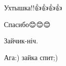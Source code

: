  
 
 
 
 

\qqSecCmt


Ухтышка!!👍👍👍👍🎨🌸

\begin{itemize} %

Спасибо😊😊😊
\end{itemize} %


Зайчик-ніч.

\begin{itemize} %

Ага:) зайка спит;)
\end{itemize} %
